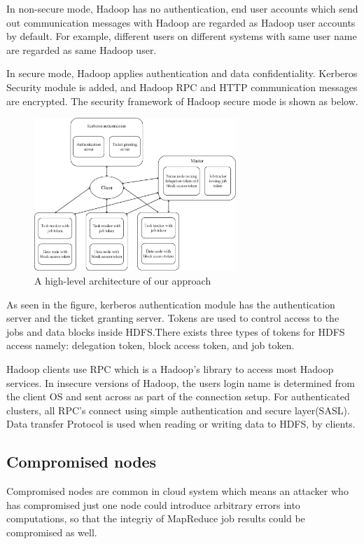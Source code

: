 In non-secure mode, Hadoop has no authentication, end user accounts which send out communication messages with Hadoop are regarded as Hadoop user accounts by default. For example, different users on different systems with same user name are regarded as same Hadoop user.

In secure mode, Hadoop applies authentication and data confidentiality. Kerberos Security module is added, and Hadoop RPC and HTTP communication messages are encrypted. The security framework of Hadoop secure mode is shown as below.

\begin{figure}[t]
  \centering
  \includegraphics[width=3in]{figs/security_hadoop.eps}
  \caption{A high-level architecture of our approach}
  \label{fig:securityoverview}
\end{figure}

As seen in the figure, kerberos authentication module has the authentication server and the ticket granting server. Tokens are used to control access to the jobs and data blocks inside HDFS.There exists three types of tokens for HDFS access namely: delegation token, block access token, and job token.

Hadoop clients use RPC which is a Hadoop’s library to access most Hadoop services. In insecure versions of Hadoop, the users login name is determined from the client OS and sent across as part of the connection setup. For authenticated clusters, all RPC’s connect using simple authentication and secure layer(SASL). Data transfer Protocol is used when reading or writing data to HDFS, by clients.

\subsection{Compromised nodes}

Compromised nodes are common in cloud system which means an attacker who has compromised just one node could introduce arbitrary errors into computations, so that the integriy of MapReduce job results could be compromised as well.

